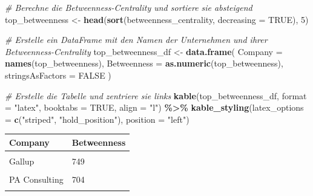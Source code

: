 \documentclass[
]{article}
\newenvironment{Shaded}{\begin{snugshade}}{\end{snugshade}}
\newcommand{\AttributeTok}[1]{\textcolor[rgb]{0.13,0.29,0.53}{#1}}
\newcommand{\CommentTok}[1]{\textcolor[rgb]{0.56,0.35,0.01}{\textit{#1}}}
\newcommand{\ConstantTok}[1]{\textcolor[rgb]{0.56,0.35,0.01}{#1}}
\newcommand{\DecValTok}[1]{\textcolor[rgb]{0.00,0.00,0.81}{#1}}
\newcommand{\FunctionTok}[1]{\textcolor[rgb]{0.13,0.29,0.53}{\textbf{#1}}}
\newcommand{\NormalTok}[1]{#1}
\newcommand{\OtherTok}[1]{\textcolor[rgb]{0.56,0.35,0.01}{#1}}
\newcommand{\SpecialCharTok}[1]{\textcolor[rgb]{0.81,0.36,0.00}{\textbf{#1}}}
\newcommand{\StringTok}[1]{\textcolor[rgb]{0.31,0.60,0.02}{#1}}
\begin{document}
\begin{Shaded}
\begin{Highlighting}[]
\CommentTok{\# Berechne die Betweenness{-}Centrality und sortiere sie absteigend}
\NormalTok{top\_betweenness }\OtherTok{\textless{}{-}} \FunctionTok{head}\NormalTok{(}\FunctionTok{sort}\NormalTok{(betweenness\_centrality, }\AttributeTok{decreasing =} \ConstantTok{TRUE}\NormalTok{), }\DecValTok{5}\NormalTok{)}

\CommentTok{\# Erstelle ein DataFrame mit den Namen der Unternehmen und ihrer Betweenness{-}Centrality}
\NormalTok{top\_betweenness\_df }\OtherTok{\textless{}{-}} \FunctionTok{data.frame}\NormalTok{(}
  \AttributeTok{Company =} \FunctionTok{names}\NormalTok{(top\_betweenness),}
  \AttributeTok{Betweenness =} \FunctionTok{as.numeric}\NormalTok{(top\_betweenness),}
  \AttributeTok{stringsAsFactors =} \ConstantTok{FALSE}
\NormalTok{)}

\CommentTok{\# Erstelle die Tabelle und zentriere sie links}
\FunctionTok{kable}\NormalTok{(top\_betweenness\_df, }\AttributeTok{format =} \StringTok{"latex"}\NormalTok{, }\AttributeTok{booktabs =} \ConstantTok{TRUE}\NormalTok{, }\AttributeTok{align =} \StringTok{"l"}\NormalTok{) }\SpecialCharTok{\%\textgreater{}\%}
\FunctionTok{kable\_styling}\NormalTok{(}\AttributeTok{latex\_options =} \FunctionTok{c}\NormalTok{(}\StringTok{"striped"}\NormalTok{, }\StringTok{"hold\_position"}\NormalTok{), }\AttributeTok{position =} \StringTok{"left"}\NormalTok{)}
\end{Highlighting}
\end{Shaded}

\begin{tabular}{ll}
\toprule
Company & Betweenness\\
\midrule
\cellcolor{gray!10}{Booz Allen Hamilton} & \cellcolor{gray!10}{830}\\
Gallup & 749\\
\cellcolor{gray!10}{McKinsey \& Company} & \cellcolor{gray!10}{713}\\
PA Consulting & 704\\
\cellcolor{gray!10}{General Dynamics Information Technology} & \cellcolor{gray!10}{695}\\
\bottomrule
\end{tabular}
\end{document}
